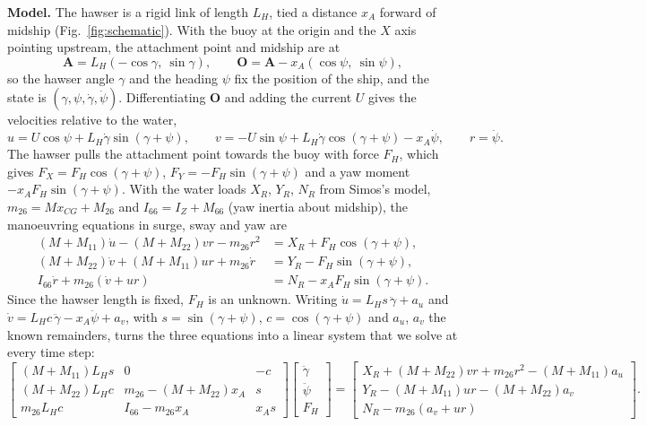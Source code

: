 \documentclass[11pt,a4paper]{article}
\begin{document}
\textbf{Model.} The hawser is a rigid link of length $L_H$, tied a distance $x_A$ forward of midship
(Fig.~\ref{fig:schematic}). With the buoy at the origin and the $X$ axis pointing upstream, the attachment point and
midship are at
\begin{equation}
\mathbf A=L_H(-\cos\gamma,\ \sin\gamma),\qquad \mathbf O=\mathbf A-x_A(\cos\psi,\ \sin\psi),
\end{equation}
so the hawser angle $\gamma$ and the heading $\psi$ fix the position of the ship, and the state is
$(\gamma,\psi,\dot\gamma,\dot\psi)$. Differentiating $\mathbf O$ and adding the current $U$ gives the velocities
relative to the water,
\begin{equation}
u = U\cos\psi + L_H\dot\gamma\sin(\gamma+\psi),\qquad
v = -U\sin\psi + L_H\dot\gamma\cos(\gamma+\psi) - x_A\dot\psi,\qquad
r=\dot\psi.
\end{equation}
The hawser pulls the attachment point towards the buoy with force $F_H$, which gives
$F_X=F_H\cos(\gamma+\psi)$, $F_Y=-F_H\sin(\gamma+\psi)$ and a yaw moment $-x_AF_H\sin(\gamma+\psi)$. With the water
loads $X_R$, $Y_R$, $N_R$ from Simos's model, $m_{26}=Mx_{CG}+M_{26}$ and $I_{66}=I_Z+M_{66}$ (yaw inertia about
midship), the manoeuvring equations in surge, sway and yaw are
\begin{equation}
\begin{aligned}
(M+M_{11})\dot u-(M+M_{22})vr-m_{26}r^2&=X_R+F_H\cos(\gamma+\psi),\\
(M+M_{22})\dot v+(M+M_{11})ur+m_{26}\dot r&=Y_R-F_H\sin(\gamma+\psi),\\
I_{66}\dot r+m_{26}(\dot v+ur)&=N_R-x_AF_H\sin(\gamma+\psi).
\end{aligned}
\end{equation}
Since the hawser length is fixed, $F_H$ is an unknown. Writing $\dot u=L_H s\,\ddot\gamma+a_u$ and
$\dot v=L_H c\,\ddot\gamma-x_A\ddot\psi+a_v$, with $s=\sin(\gamma+\psi)$, $c=\cos(\gamma+\psi)$ and $a_u$, $a_v$ the
known remainders, turns the three equations into a linear system that we solve at every time step:
{\small
\begin{equation}
\begin{bmatrix}
(M+M_{11})L_Hs & 0 & -c\\
(M+M_{22})L_Hc & m_{26}-(M+M_{22})x_A & s\\
m_{26}L_Hc & I_{66}-m_{26}x_A & x_As
\end{bmatrix}
\begin{bmatrix}\ddot\gamma\\\ddot\psi\\F_H\end{bmatrix}
=
\begin{bmatrix}
X_R+(M+M_{22})vr+m_{26}r^2-(M+M_{11})a_u\\
Y_R-(M+M_{11})ur-(M+M_{22})a_v\\
N_R-m_{26}(a_v+ur)
\end{bmatrix}.
\end{equation}}
\end{document}
